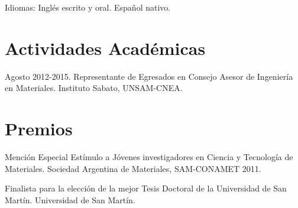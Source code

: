 Idiomas: Inglés escrito y oral. Español nativo.

\section{Actividades Académicas}\label{actividades-acaduxe9micas}

Agosto 2012-2015. Representante de Egresados en Consejo Asesor de
Ingeniería en Materiales. Instituto Sabato, UNSAM-CNEA.

\section{Premios}\label{premios}

Mención Especial Estímulo a Jóvenes investigadores en Ciencia y
Tecnología de Materiales. Sociedad Argentina de Materiales, SAM-CONAMET
2011.

Finalista para la elección de la mejor Tesis Doctoral de la Universidad
de San Martín. Universidad de San Martín. 
